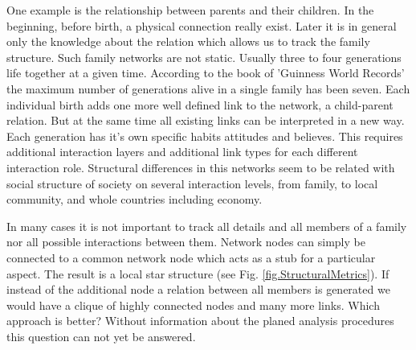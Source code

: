 \documentclass[a4paper,10pt]{scrbook}
\begin{document}
One example is the relationship between parents and their children. In the beginning, before birth, a physical connection really exist. Later it is in general only the knowledge about the relation which allows us to track the family structure. Such family networks are not static. Usually three to four generations life together at a given time. According to the book of 'Guinness World Records' the maximum number of generations alive in a single family has been seven. 
Each individual birth adds one more well defined link to the network, a child-parent relation. But at the same time all existing links can be interpreted in a new way. Each generation has it's own specific habits attitudes and believes. This requires additional interaction layers and additional link types for each different interaction role. Structural differences in this networks seem to be related with social structure of society on several interaction levels, from family, to local community, and whole countries including economy.

In many cases it is not important to track all details and all members of a family nor all possible interactions between them. Network nodes can simply be connected to a common network node which acts as a stub for a particular aspect. The result is a local star structure (see Fig. \ref{fig.StructuralMetrics}). If instead of the additional node a relation between all members is generated we would have a clique of highly connected nodes and many more links. Which approach is better? Without information about the planed analysis procedures this question can not yet be answered.

\end{document}
